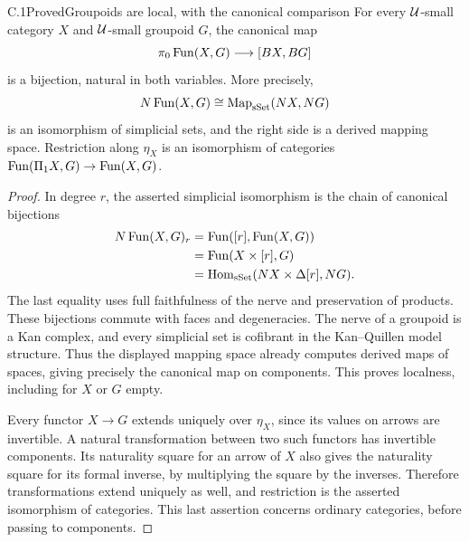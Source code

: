 \begin{claim}{C.1}{Proved}{Groupoids are local, with the canonical comparison}
For every $\mathcal U$-small category $X$ and $\mathcal U$-small groupoid $G$, the
canonical map
\[
 \pi_0\operatorname{Fun}(X,G)\longrightarrow[BX,BG]
\]
is a bijection, natural in both variables.  More precisely,
\[
 N\operatorname{Fun}(X,G)\cong\operatorname{Map}_{\mathrm{sSet}}(NX,NG)
\]
is an isomorphism of simplicial sets, and the right side is a derived
mapping space.  Restriction along $\eta_X$ is an isomorphism of
categories $\operatorname{Fun}(\Pi_1X,G)\to\operatorname{Fun}(X,G)$.
\end{claim}
\begin{proof}
In degree $r$, the asserted simplicial isomorphism is the chain of
canonical bijections
\[
\begin{split}
N\operatorname{Fun}(X,G)_r
 &=\operatorname{Fun}([r],\operatorname{Fun}(X,G))\\
 &=\operatorname{Fun}(X\times[r],G)\\
 &=\operatorname{Hom}_{\mathrm{sSet}}(NX\times\Delta[r],NG).
\end{split}
\]
The last equality uses full faithfulness of the nerve and preservation
of products.  These bijections commute with faces and degeneracies.
The nerve of a groupoid is a Kan complex, and every simplicial set is
cofibrant in the Kan--Quillen model structure.  Thus the displayed
mapping space already computes derived maps of spaces, giving precisely
the canonical map on components.  This proves localness, including for
$X$ or $G$ empty.

Every functor $X\to G$ extends uniquely over $\eta_X$, since its values
on arrows are invertible.  A natural transformation between two such
functors has invertible components.  Its naturality square for an arrow
of $X$ also gives the naturality square for its formal inverse, by
multiplying the square by the inverses.  Therefore transformations extend
uniquely as well, and restriction is the asserted isomorphism of
categories.  This last assertion concerns ordinary categories, before
passing to components.
\end{proof}

